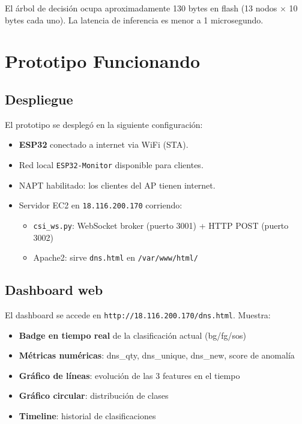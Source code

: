 \documentclass[12pt,a4paper]{article}
\begin{document}
El árbol de decisión ocupa aproximadamente 130 bytes en flash (13 nodos $\times$ 10 bytes cada uno). La latencia de inferencia es menor a 1 microsegundo.

\section{Prototipo Funcionando}
\label{sec:prototipo}

\subsection{Despliegue}
\label{sec:despliegue}

El prototipo se desplegó en la siguiente configuración:

\begin{itemize}
    \item \textbf{ESP32} conectado a internet via WiFi (STA).
    \item Red local \texttt{ESP32-Monitor} disponible para clientes.
    \item NAPT habilitado: los clientes del AP tienen internet.
    \item Servidor EC2 en \texttt{18.116.200.170} corriendo:
        \begin{itemize}
            \item \texttt{csi\_ws.py}: WebSocket broker (puerto 3001) + HTTP POST (puerto 3002)
            \item Apache2: sirve \texttt{dns.html} en \texttt{/var/www/html/}
        \end{itemize}
\end{itemize}

\subsection{Dashboard web}
\label{sec:dashboard}

El dashboard se accede en \texttt{http://18.116.200.170/dns.html}. Muestra:

\begin{itemize}
    \item \textbf{Badge en tiempo real} de la clasificación actual (bg/fg/sos)
    \item \textbf{Métricas numéricas}: dns\_qty, dns\_unique, dns\_new, score de anomalía
    \item \textbf{Gráfico de líneas}: evolución de las 3 features en el tiempo
    \item \textbf{Gráfico circular}: distribución de clases
    \item \textbf{Timeline}: historial de clasificaciones
\end{itemize}
\end{document}
